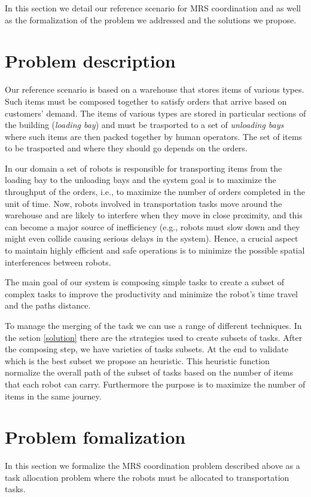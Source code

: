 In this section we detail our reference scenario for MRS coordination and as well 
as the formalization of the problem we addressed and the solutions we propose.

\section{Problem description}
Our reference scenario is based on a warehouse that stores items of various types.
Such items must be composed together to satisfy orders that arrive based on customers’ demand.
The items of various types are stored in particular sections of the building (\textit{loading bay})
and must be trasported to a set of \textit{unloading bays} where such items are then 
packed together by human operators. The set of items to be trasported and where they should
go depends on the orders.

In our domain a set of robots is responsible for transporting items from
the loading bay to the unloading bays and the system goal is to maximize the
throughput of the orders, i.e., to maximize the number of orders completed in
the unit of time. Now, robots involved in transportation tasks move around
the warehouse and are likely to interfere when they move in close proximity,
and this can become a major source of inefficiency (e.g., robots must slow down
and they might even collide causing serious delays in the system).
Hence, a crucial aspect to maintain highly efficient and safe operations is to minimize the
possible spatial interferences between robots.

The main goal of our system is composing simple tasks to create a subset of complex tasks
to improve the productivity and minimize the robot's time travel and the paths distance.

To manage the merging of the task we can use a range of different techniques. 
In the setion \ref{solution} there are the strategies used to create subsets of tasks. 
After the composing step, we have varieties of tasks subsets. At the end to validate which is the best
subset we propose an heuristic. This heuristic function normalize the overall path of the subset of tasks
based on the number of items that each robot can carry.
Furthermore the purpose is to maximize the number of items in the same journey.


\section{Problem fomalization}
In this section we formalize the MRS coordination problem described above as a task allocation problem
where the robots must be allocated to transportation tasks. 

